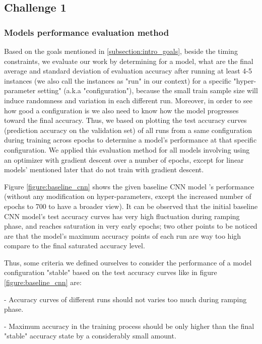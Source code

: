 \documentclass[10pt,twocolumn,letterpaper]{article}
\begin{document}
\subsection{Challenge 1}
\label{challenge1_subsection}

\subsubsection{Models performance evaluation method}
\label{subsubsection:eval_method}
Based on the goals mentioned in \ref{subsection:intro_goals}, beside the timing constraints, we evaluate our work by determining for a model, what are the final average and standard deviation of evaluation accuracy after running at least 4-5 instances (we also call the instances as "run" in our context) for a specific "hyper-parameter setting" (a.k.a "configuration"), because the small train sample size will induce randomness and variation in each different run. Moreover, in order to see how good a configuration is we also need to know how the model progresses toward the final accuracy. Thus, we based on plotting the test accuracy curves (prediction accuracy on the validation set) of all runs from a same configuration during training across epochs to determine a model's performance at that specific configuration. We applied this evaluation method for all models involving using an optimizer with gradient descent over a number of epochs, except for linear models' mentioned later that do not train with gradient descent. 

Figure \ref{figure:baseline_cnn} shows the given baseline CNN model 's performance (without any modification on hyper-parameters, except the increased number of epochs to 700 to have a broader view). It can be observed that the initial baseline CNN model's test accuracy curves has very high fluctuation during ramping phase, and reaches saturation in very early epochs; two other points to be noticed are that the model's maximum accuracy points of each run are way too high compare to the final saturated accuracy level.      

Thus, some criteria we defined ourselves to consider the performance of a model configuration "stable" based on the test accuracy curves like in  figure \ref{figure:baseline_cnn} are:

\hspace{0.2cm}- Accuracy curves of different runs should not varies too much during ramping phase.

\hspace{0.2cm}- Maximum accuracy in the training process should be only higher than the final "stable" accuracy state by a considerably small amount.
\end{document}

